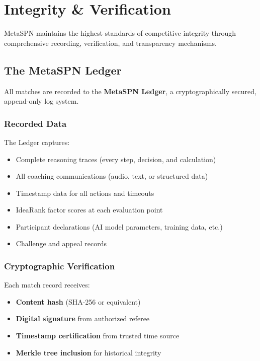 \chapter{Integrity \& Verification}
\label{ch:integrity}

MetaSPN maintains the highest standards of competitive integrity through comprehensive recording, verification, and transparency mechanisms.

\section{The MetaSPN Ledger}

All matches are recorded to the \textbf{MetaSPN Ledger}, a cryptographically secured, append-only log system.

\subsection{Recorded Data}

The Ledger captures:
\begin{itemize}[leftmargin=*]
  \item Complete reasoning traces (every step, decision, and calculation)
  \item All coaching communications (audio, text, or structured data)
  \item Timestamp data for all actions and timeouts
  \item IdeaRank factor scores at each evaluation point
  \item Participant declarations (AI model parameters, training data, etc.)
  \item Challenge and appeal records
\end{itemize}

\subsection{Cryptographic Verification}

Each match record receives:
\begin{itemize}[leftmargin=*]
  \item \textbf{Content hash} (SHA-256 or equivalent)
  \item \textbf{Digital signature} from authorized referee
  \item \textbf{Timestamp certification} from trusted time source
  \item \textbf{Merkle tree inclusion} for historical integrity
\end{itemize}

